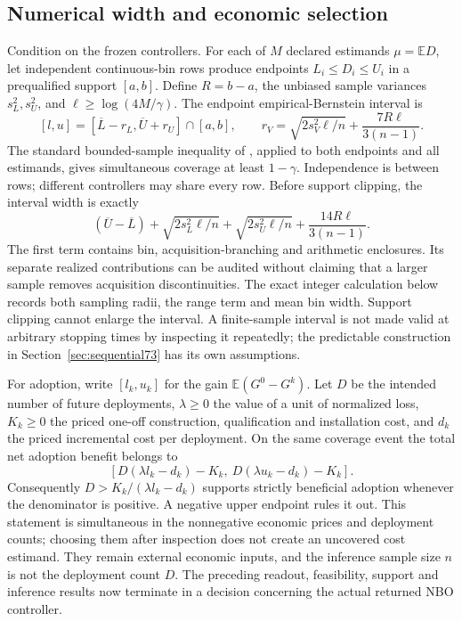 \subsection{Numerical width and economic selection}
Condition on the frozen controllers. For each of $M$ declared estimands $\mu=\mathbb E D$, let independent continuous-bin rows produce endpoints $L_i\le D_i\le U_i$ in a prequalified support $[a,b]$. Define $R=b-a$, the unbiased sample variances $s_L^2,s_U^2$, and $\ell\ge\log(4M/\gamma)$. The endpoint empirical-Bernstein interval is
\begin{equation}\label{eq:cost-interval75}
 [l,u]=[\overline L-r_L,\overline U+r_U]\cap[a,b],\qquad
 r_V=\sqrt{2s_V^2\ell/n}+\frac{7R\ell}{3(n-1)}.
\end{equation}
The standard bounded-sample inequality of \citet{maurer2009}, applied to both endpoints and all estimands, gives simultaneous coverage at least $1-\gamma$. Independence is between rows; different controllers may share every row. Before support clipping, the interval width is exactly
\begin{equation}\label{eq:width-ledger75}
 (\overline U-\overline L)
 +\sqrt{2s_L^2\ell/n}+\sqrt{2s_U^2\ell/n}
 +\frac{14R\ell}{3(n-1)}.
\end{equation}
The first term contains bin, acquisition-branching and arithmetic enclosures. Its separate realized contributions can be audited without claiming that a larger sample removes acquisition discontinuities. The exact integer calculation below records both sampling radii, the range term and mean bin width. Support clipping cannot enlarge the interval. A finite-sample interval is not made valid at arbitrary stopping times by inspecting it repeatedly; the predictable construction in Section~\ref{sec:sequential73} has its own assumptions.

For adoption, write $[l_k,u_k]$ for the gain $\mathbb E(G^0-G^k)$. Let $D$ be the intended number of future deployments, $\lambda\ge0$ the value of a unit of normalized loss, $K_k\ge0$ the priced one-off construction, qualification and installation cost, and $d_k$ the priced incremental cost per deployment. On the same coverage event the total net adoption benefit belongs to
\begin{equation}\label{eq:adoption75}
 [D(\lambda l_k-d_k)-K_k,\ D(\lambda u_k-d_k)-K_k].
\end{equation}
Consequently $D>K_k/(\lambda l_k-d_k)$ supports strictly beneficial adoption whenever the denominator is positive. A negative upper endpoint rules it out. This statement is simultaneous in the nonnegative economic prices and deployment counts; choosing them after inspection does not create an uncovered cost estimand. They remain external economic inputs, and the inference sample size $n$ is not the deployment count $D$. The preceding readout, feasibility, support and inference results now terminate in a decision concerning the actual returned NBO controller.
